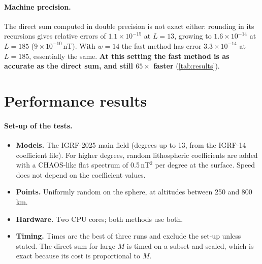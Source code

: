 \documentclass[11pt,a4paper]{article}
\theoremstyle{definition}
\begin{document}
\paragraph{Machine precision.}\label{sec:roundoff} The direct sum computed in double precision is not exact either: rounding in its recursions gives
relative errors of $1.1\times10^{-15}$ at $L=13$, growing to $1.6\times10^{-14}$ at $L=185$ ($9\times10^{-10}$\,nT). With $w=14$ the fast method has error
$3.3\times10^{-14}$ at $L=185$, essentially the same. \textbf{At this setting the fast method is as accurate as the direct sum, and still $65\times$ faster} (\cref{tab:results}).

\section{Performance results}\label{sec:results}

\paragraph{Set-up of the tests.}
\begin{itemize}
\item \textbf{Models.} The IGRF-2025 main field (degrees up to 13, from the IGRF-14 coefficient file). For higher degrees, random
  lithospheric coefficients are added with a CHAOS-like flat spectrum of 0.5\,nT$^2$ per degree at the surface. Speed does not depend on the
  coefficient values.
\item \textbf{Points.} Uniformly random on the sphere, at altitudes between 250 and 800\,km.
\item \textbf{Hardware.} Two CPU cores; both methods use both.
\item \textbf{Timing.} Times are the best of three runs and exclude the set-up unless stated. The direct sum for large $M$ is timed on a subset and scaled, which is
  exact because its cost is proportional to $M$.
\end{itemize}
\end{document}
